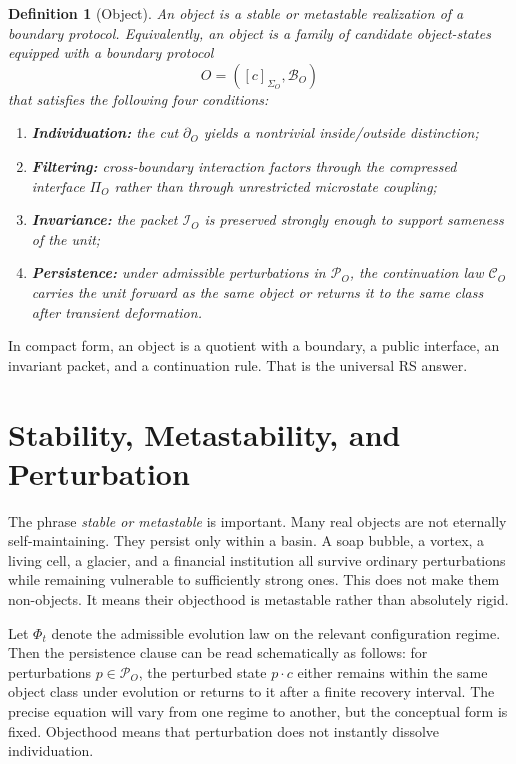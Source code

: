 \documentclass[11pt]{article}
\newtheorem{definition}{Definition}
\begin{document}
\begin{definition}[Object]
An object is a stable or metastable realization of a boundary protocol.
Equivalently, an object is a family of candidate object-states equipped with a boundary protocol
\[
O = ([c]_{\Sigma_O},\mathcal{B}_O)
\]
that satisfies the following four conditions:
\begin{enumerate}
    \item \textbf{Individuation:} the cut $\partial_O$ yields a nontrivial inside/outside distinction;
    \item \textbf{Filtering:} cross-boundary interaction factors through the compressed interface $\Pi_O$ rather than through unrestricted microstate coupling;
    \item \textbf{Invariance:} the packet $\mathcal{I}_O$ is preserved strongly enough to support sameness of the unit;
    \item \textbf{Persistence:} under admissible perturbations in $\mathcal{P}_O$, the continuation law $\mathcal{C}_O$ carries the unit forward as the same object or returns it to the same class after transient deformation.
\end{enumerate}
\end{definition}

In compact form, an object is a quotient with a boundary, a public interface, an invariant packet, and a continuation rule.
That is the universal RS answer.

\section{Stability, Metastability, and Perturbation}

The phrase \emph{stable or metastable} is important.
Many real objects are not eternally self-maintaining.
They persist only within a basin.
A soap bubble, a vortex, a living cell, a glacier, and a financial institution all survive ordinary perturbations while remaining vulnerable to sufficiently strong ones.
This does not make them non-objects.
It means their objecthood is metastable rather than absolutely rigid.

Let $\Phi_t$ denote the admissible evolution law on the relevant configuration regime.
Then the persistence clause can be read schematically as follows: for perturbations $p\in \mathcal{P}_O$, the perturbed state $p\cdot c$ either remains within the same object class under evolution or returns to it after a finite recovery interval.
The precise equation will vary from one regime to another, but the conceptual form is fixed.
Objecthood means that perturbation does not instantly dissolve individuation.
\end{document}
